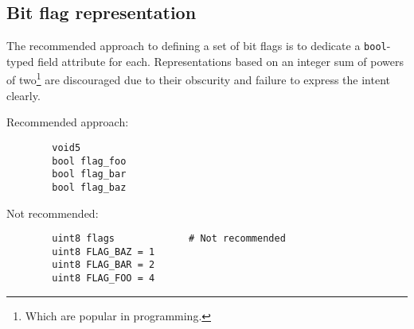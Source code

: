 \subsection{Bit flag representation}

The recommended approach to defining a set of bit flags is to dedicate a \verb|bool|-typed field attribute for each.
Representations based on an integer sum of powers of two\footnote{Which are popular in programming.}
are discouraged due to their obscurity and failure to express the intent clearly.

\begin{remark}
    Recommended approach:

    \begin{verbatim}
        void5
        bool flag_foo
        bool flag_bar
        bool flag_baz
    \end{verbatim}

    Not recommended:

    \begin{verbatim}
        uint8 flags             # Not recommended
        uint8 FLAG_BAZ = 1
        uint8 FLAG_BAR = 2
        uint8 FLAG_FOO = 4
    \end{verbatim}
\end{remark}
